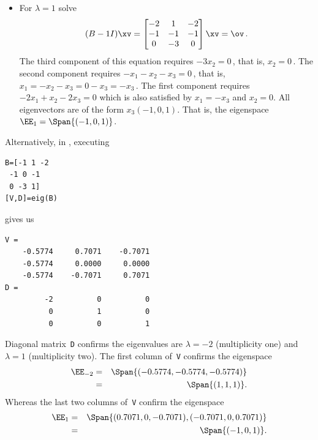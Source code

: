 \begin{example}
\begin{description}
\begin{solution}
\begin{itemize}
\item For \(\lambda=1\) solve
\begin{equation*}
(B-1I)\xv=\begin{bmatrix}-2&1&-2
\\-1&-1&-1
\\0&-3&0 \end{bmatrix}\xv=\ov\,.
\end{equation*}
The third component of this equation requires \(-3x_2=0\)\,, that is, \(x_2=0\)\,.
The second component requires \(-x_1-x_2-x_3=0\)\,, that is, \(x_1=-x_2-x_3=0-x_3=-x_3\)\,.
The first component requires \(-2x_1+x_2-2x_3=0\) which is also satisfied by \(x_1=-x_3\) and \(x_2=0\).
All eigenvectors are of the form \(x_3(-1,0,1)\).
That is, the eigenspace \(\EE_{1}=\Span\{(-1,0,1)\}\).
\end{itemize}

Alternatively, in \script, executing 
\begin{verbatim}
B=[-1 1 -2
 -1 0 -1
 0 -3 1]
[V,D]=eig(B)
\end{verbatim}
gives us
\begin{verbatim}
V =
    -0.5774     0.7071    -0.7071
    -0.5774     0.0000     0.0000
    -0.5774    -0.7071     0.7071
D =
         -2          0          0
          0          1          0
          0          0          1
\end{verbatim}
Diagonal matrix~\verb|D| confirms the eigenvalues are \(\lambda=-2\) (multiplicity one) and \(\lambda=1\) (multiplicity two). 
The first column of~\verb|V| confirms the eigenspace 
\begin{eqnarray*}
\EE_{-2}&=&\Span\{(-0.5774,-0.5774,-0.5774)\}
\\&=&\Span\{(1,1,1)\}.
\end{eqnarray*}
Whereas the last two columns of~\verb|V| confirm the eigenspace 
\begin{eqnarray*}
\EE_1&=&\Span\{(0.7071,0,-0.7071),(-0.7071,0,0.7071)\}
\\&=&\Span\{(-1,0,1)\}.
\end{eqnarray*}
\end{solution}


\end{description}
\end{example}
